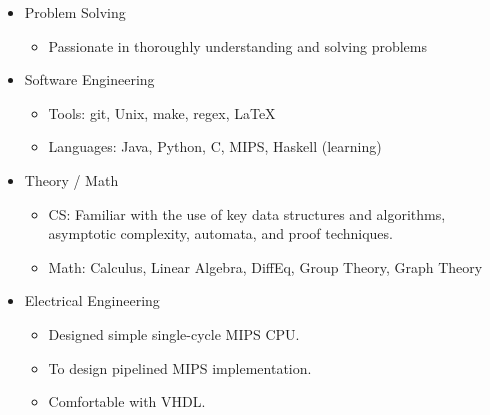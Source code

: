 \documentclass[18pt]{article}
\providecommand{\tightlist}{
    \setlength{\itemsep}{0pt}\setlength{\parskip}{0pt}
}
\begin{document}
\begin{multicols}{2}
\begin{itemize}
        \item Problem Solving
        \begin{itemize}\tightlist
          \item Passionate in thoroughly understanding and solving problems
        \end{itemize}

        \item Software Engineering
        \begin{itemize}\tightlist
          \item Tools: git, Unix, make, regex, \LaTeX
          \item Languages: Java, Python, C, MIPS, Haskell (learning)
        \end{itemize}

        \item Theory / Math
        \begin{itemize}\tightlist
          \item CS: Familiar with the use of key data structures and algorithms, asymptotic complexity, automata, and proof techniques.
          \item Math: Calculus, Linear Algebra, DiffEq, Group Theory, Graph Theory
        \end{itemize}

        \item Electrical Engineering
        \begin{itemize}\tightlist
          \item Designed simple single-cycle MIPS CPU.
          \item To design pipelined MIPS implementation.
          \item Comfortable with VHDL.
        \end{itemize}

      \end{itemize} %

  \end{multicols}
\end{document}
